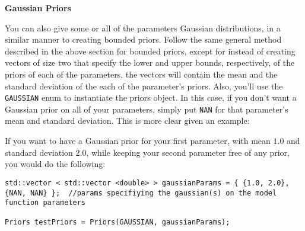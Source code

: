\documentclass[12pt]{article}
\newcommand{\li}{\lstinline}
\begin{document}
\textbf{Gaussian Priors}
\par You can also give some or all of the parameters Gaussian distributions, in a similar manner to creating bounded priors. Follow the same general method described in the above section for bounded priors, except for instead of creating vectors of size two that specify the lower and upper bounds, respectively, of the priors of each of the parameters, the vectors will contain the mean and the standard deviation of the each of the parameter's priors. Also, you'll use the \li{GAUSSIAN} enum to instantiate the priors object. In this case, if you don't want a Gaussian prior on all of your parameters, simply put \li{NAN} for that parameter's mean and standard deviation. This is more clear given an example:
\par If you want to have a Gaussian prior for your first parameter, with mean $1.0$ and standard deviation $2.0$, while keeping your second parameter free of any prior, you would do the following:
\begin{lstlisting}
std::vector < std::vector <double> > gaussianParams = { {1.0, 2.0}, {NAN, NAN} };  //params specifiying the gaussian(s) on the model function parameters

Priors testPriors = Priors(GAUSSIAN, gaussianParams);
\end{lstlisting}
\end{document}

